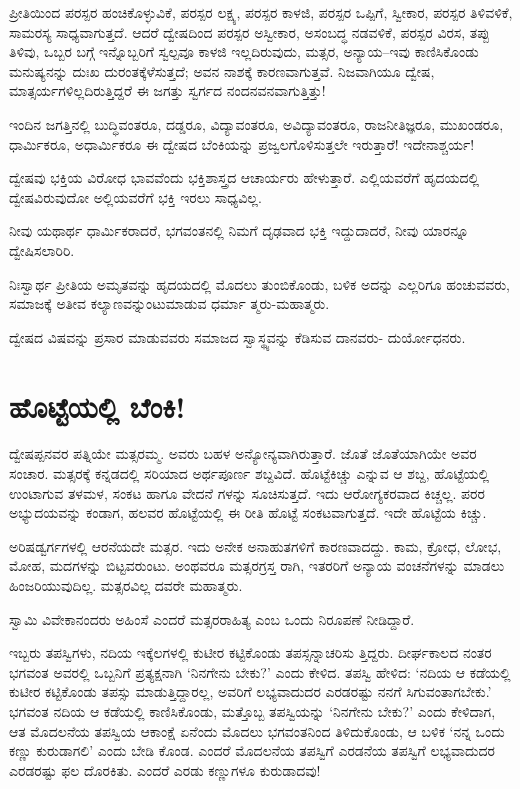 ಪ್ರೀತಿಯಿಂದ ಪರಸ್ಪರ ಹಂಚಿಕೊಳ್ಳುವಿಕೆ, ಪರಸ್ಪರ ಲಕ್ಷ್ಯ, ಪರಸ್ಪರ ಕಾಳಜಿ, ಪರಸ್ಪರ ಒಪ್ಪಿಗೆ, ಸ್ವೀಕಾರ, ಪರಸ್ಪರ ತಿಳಿವಳಿಕೆ, ಸಾಮರಸ್ಯ ಸಾಧ್ಯವಾಗುತ್ತದೆ. ಆದರೆ ದ್ವೇಷದಿಂದ ಪರಸ್ಪರ ಅಸ್ವೀಕಾರ, ಅಸಂಬದ್ಧ ನಡವಳಿಕೆ, ಪರಸ್ಪರ ವಿರಸ, ತಪ್ಪು ತಿಳಿವು, ಒಬ್ಬರ ಬಗ್ಗೆ ಇನ್ನೊಬ್ಬರಿಗೆ ಸ್ವಲ್ಪವೂ ಕಾಳಜಿ ಇಲ್ಲದಿರುವುದು, ಮತ್ಸರ, ಅನ್ಯಾಯ–ಇವು ಕಾಣಿಸಿಕೊಂಡು ಮನುಷ್ಯನನ್ನು ದುಃಖ ದುರಂತಕ್ಕೆಳೆಸುತ್ತದೆ; ಅವನ ನಾಶಕ್ಕೆ ಕಾರಣವಾಗುತ್ತವೆ. ನಿಜವಾಗಿಯೂ ದ್ವೇಷ, ಮಾತ್ಸರ್ಯಗಳಿಲ್ಲದಿರುತ್ತಿದ್ದರೆ ಈ ಜಗತ್ತು ಸ್ವರ್ಗದ ನಂದನವನವಾಗುತ್ತಿತ್ತು!

ಇಂದಿನ ಜಗತ್ತಿನಲ್ಲಿ ಬುದ್ಧಿವಂತರೂ, ದಡ್ಡರೂ, ವಿದ್ಯಾವಂತರೂ, ಅವಿದ್ಯಾವಂತರೂ, ರಾಜನೀತಿಜ್ಞರೂ, ಮುಖಂಡರೂ, ಧಾರ್ಮಿಕರೂ, ಅಧಾರ್ಮಿಕರೂ ಈ ದ್ವೇಷದ ಬೆಂಕಿಯನ್ನು ಪ್ರಜ್ವಲಗೊಳಿಸುತ್ತಲೇ ಇರುತ್ತಾರೆ! ಇದೇನಾಶ್ಚರ್ಯ!

ದ್ವೇಷವು ಭಕ್ತಿಯ ವಿರೋಧ ಭಾವವೆಂದು ಭಕ್ತಿಶಾಸ್ತ್ರದ ಆಚಾರ್ಯರು ಹೇಳುತ್ತಾರೆ. ಎಲ್ಲಿಯವರೆಗೆ ಹೃದಯದಲ್ಲಿ ದ್ವೇಷವಿರುವುದೋ ಅಲ್ಲಿಯವರೆಗೆ ಭಕ್ತಿ ಇರಲು ಸಾಧ್ಯವಿಲ್ಲ.

ನೀವು ಯಥಾರ್ಥ ಧಾರ್ಮಿಕರಾದರೆ, ಭಗವಂತನಲ್ಲಿ ನಿಮಗೆ ದೃಢವಾದ ಭಕ್ತಿ ಇದ್ದುದಾದರೆ, ನೀವು ಯಾರನ್ನೂ ದ್ವೇಷಿಸಲಾರಿರಿ.

ನಿಃಸ್ವಾರ್ಥ ಪ್ರೀತಿಯ ಅಮೃತವನ್ನು ಹೃದಯದಲ್ಲಿ ಮೊದಲು ತುಂಬಿಕೊಂಡು, ಬಳಿಕ ಅದನ್ನು ಎಲ್ಲರಿಗೂ ಹಂಚುವವರು, ಸಮಾಜಕ್ಕೆ ಅತೀವ ಕಲ್ಯಾಣವನ್ನುಂಟುಮಾಡುವ ಧರ್ಮಾ ತ್ಮರು-ಮಹಾತ್ಮರು.

ದ್ವೇಷದ ವಿಷವನ್ನು ಪ್ರಸಾರ ಮಾಡುವವರು ಸಮಾಜದ ಸ್ವಾಸ್ಥ್ಯವನ್ನು ಕೆಡಿಸುವ ದಾನವರು- ದುರ್ಯೋಧನರು.


\section{ಹೊಟ್ಟೆಯಲ್ಲಿ ಬೆಂಕಿ!}

ದ್ವೇಷಪ್ಪನವರ ಪತ್ನಿಯೇ ಮತ್ಸರಮ್ಮ. ಅವರು ಬಹಳ ಅನ್ಯೋನ್ಯವಾಗಿರುತ್ತಾರೆ. ಜೊತೆ ಜೊತೆಯಾಗಿಯೇ ಅವರ ಸಂಚಾರ. ಮತ್ಸರಕ್ಕೆ ಕನ್ನಡದಲ್ಲಿ ಸರಿಯಾದ ಅರ್ಥಪೂರ್ಣ ಶಬ್ದವಿದೆ. ಹೊಟ್ಟೆಕಿಚ್ಚು ಎನ್ನುವ ಆ ಶಬ್ದ, ಹೊಟ್ಟೆಯಲ್ಲಿ ಉಂಟಾಗುವ ತಳಮಳ, ಸಂಕಟ ಹಾಗೂ ವೇದನೆ ಗಳನ್ನು ಸೂಚಿಸುತ್ತದೆ. ಇದು ಆರೋಗ್ಯಕರವಾದ ಕಿಚ್ಚಲ್ಲ. ಪರರ ಅಭ್ಯುದಯವನ್ನು ಕಂಡಾಗ, ಹಲವರ ಹೊಟ್ಟೆಯಲ್ಲಿ ಈ ರೀತಿ ಹೊಟ್ಟೆ ಸಂಕಟವಾಗುತ್ತದೆ. ಇದೇ ಹೊಟ್ಟೆಯ ಕಿಚ್ಚು.

ಅರಿಷಡ್ವರ್ಗಗಳಲ್ಲಿ ಆರನೆಯದೇ ಮತ್ಸರ. ಇದು ಅನೇಕ ಅನಾಹುತಗಳಿಗೆ ಕಾರಣವಾದದ್ದು. ಕಾಮ, ಕ್ರೋಧ, ಲೋಭ, ಮೋಹ, ಮದಗಳನ್ನು ಬಿಟ್ಟವರುಂಟು. ಅಂಥವರೂ ಮತ್ಸರಗ್ರಸ್ತ ರಾಗಿ, ಇತರರಿಗೆ ಅನ್ಯಾಯ ವಂಚನೆಗಳನ್ನು ಮಾಡಲು ಹಿಂಜರಿಯುವುದಿಲ್ಲ. ಮತ್ಸರವಿಲ್ಲ ದವರೇ ಮಹಾತ್ಮರು.

ಸ್ವಾಮಿ ವಿವೇಕಾನಂದರು ಅಹಿಂಸೆ ಎಂದರೆ ಮತ್ಸರರಾಹಿತ್ಯ ಎಂಬ ಒಂದು ನಿರೂಪಣೆ ನೀಡಿದ್ದಾರೆ.

ಇಬ್ಬರು ತಪಸ್ವಿಗಳು, ನದಿಯ ಇಕ್ಕೆಲಗಳಲ್ಲಿ ಕುಟೀರ ಕಟ್ಟಿಕೊಂಡು ತಪಸ್ಸನ್ನಾಚರಿಸು ತ್ತಿದ್ದರು. ದೀರ್ಘಕಾಲದ ನಂತರ ಭಗವಂತ ಅವರಲ್ಲಿ ಒಬ್ಬನಿಗೆ ಪ್ರತ್ಯಕ್ಷನಾಗಿ ‘ನಿನಗೇನು ಬೇಕು?’ ಎಂದು ಕೇಳಿದ. ತಪಸ್ವಿ ಹೇಳಿದ: ‘ನದಿಯ ಆ ಕಡೆಯಲ್ಲಿ ಕುಟೀರ ಕಟ್ಟಿಕೊಂಡು ತಪಸ್ಸು ಮಾಡುತ್ತಿದ್ದಾರಲ್ಲ, ಅವರಿಗೆ ಲಭ್ಯವಾದುದರ ಎರಡರಷ್ಟು ನನಗೆ ಸಿಗುವಂತಾಗಬೇಕು.’ ಭಗವಂತ ನದಿಯ ಆ ಕಡೆಯಲ್ಲಿ ಕಾಣಿಸಿಕೊಂಡು, ಮತ್ತೊಬ್ಬ ತಪಸ್ವಿಯನ್ನು ‘ನಿನಗೇನು ಬೇಕು?’ ಎಂದು ಕೇಳಿದಾಗ, ಆತ ಮೊದಲನೆಯ ತಪಸ್ವಿಯ ಆಕಾಂಕ್ಷೆ ಏನೆಂದು ಮೊದಲು ಭಗವಂತನಿಂದ ತಿಳಿದುಕೊಂಡು, ಆ ಬಳಿಕ ‘ನನ್ನ ಒಂದು ಕಣ್ಣು ಕುರುಡಾಗಲಿ’ ಎಂದು ಬೇಡಿ ಕೊಂಡ. ಎಂದರೆ ಮೊದಲನೆಯ ತಪಸ್ವಿಗೆ ಎರಡನೆಯ ತಪಸ್ವಿಗೆ ಲಭ್ಯವಾದುದರ ಎರಡರಷ್ಟು ಫಲ ದೊರಕಿತು. ಎಂದರೆ ಎರಡು ಕಣ್ಣುಗಳೂ ಕುರುಡಾದವು!

